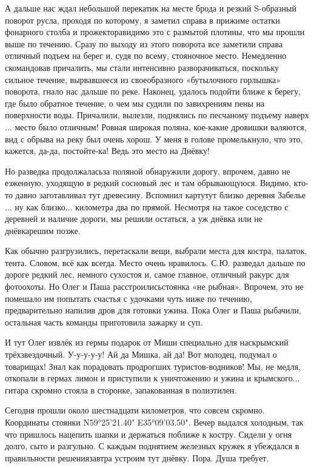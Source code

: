 А дальше нас ждал небольшой перекатик на месте брода и резкий S-образный поворот русла, проходя по которому, я заметил справа в прижиме остатки фонарного столба и прожектора\mdash видимо это с размытой плотины, что мы прошли выше по течению. Сразу по выходу из этого поворота все заметили справа отличный подъем на берег и, судя по всему, стояночное место. Немедленно скомандовав причалить, мы стали интенсивно разворачиваться, поскольку сильное течение, вырвавшееся из своеобразного «бутылочного горлышка» поворота, гнало нас дальше по реке. Наконец, удалось подойти ближе к берегу, где было обратное течение, о чем мы судили по завихрениям пены на поверхности воды. Причалили, вылезли, поднялись по песчаному подъему наверх$\ldots$ место было отличным! Ровная широкая поляна, кое-какие дровишки валяются, вид с обрыва на реку был очень хорош. У меня в голове промелькнуло, что это, кажется, да-да, постойте-ка! Ведь это место на Днёвку! 

Но разведка продолжалась\mdash за поляной обнаружили дорогу, впрочем, давно не езженную, уходящую в редкий сосновый лес и там обрывающуюся. Видимо, кто-то давно заготавливал тут древесину. Вспомнил карту\mdash тут близко деревня Забелье$\ldots$ ну как близко$\ldots$ километра два по прямой. Несмотря на такое соседство с деревней и наличие дороги, мы решили остаться, а уж днёвка или не днёвка\mdash решим позже.

Как обычно разгрузились, перетаскали вещи, выбрали места для костра, палаток, тента. Словом, всё как всегда. Место очень нравилось. С.Ю. разведал дальше по дороге редкий лес, немного сухостоя и, самое главное, отличный ракурс для фотоохоты. Но Олег и Паша расстроились\mdash стоянка «не рыбная». Впрочем, это не помешало им попытать счастья с удочками чуть ниже по течению, предварительно напилив дров для готовки ужина. Пока Олег и Паша рыбачили, остальная часть команды приготовила зажарку и суп.

И тут Олег извлёк из гермы подарок от Миши специально для нас\mdash крымский трёхзвездочный. У-у-у-у-у! Ай да Мишка, ай да! Вот молодец, подумал о товарищах! Знал как порадовать продрогших туристов-водников! Мы, не медля, откопали в гермах лимон и приступили к уничтожению и ужина и крымского$\ldots$ гитара скромно стояла в сторонке, запакованная в полиэтилен. 

Сегодня прошли около шестнадцати километров, что совсем скромно. Координаты стоянки N59°25'21.40" E35°09'03.50". Вечер выдался холодным, так что пришлось нацепить шапки и держаться поближе к костру. Сидели у огня долго, сыто и разгульно. С каждым поднятием железных кружек я убеждался в правильности решения\mdash завтра устроим тут днёвку. Пора. Душа требует. 

\begin{center}
\end{center}
